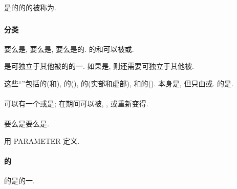 是\Function{}\Reference{}的\Execution{}的\Result{}的\Data{}\Entity{}被称为\Function{}\Result{}.

\subsubsection{\Data{}\Object{}}

\paragraph{\Data{}\Object{}分类}

\Data{}\Object{}要么是\Constant{}, 要么是\Variable{}, 要么是\Constant{}的\Subobject{}. \Named{}\Data{}\Object{}的\Type{}和\TypeParameter{}可以被\Explicitly{}或\Implicitly{}\Specify{}.

\Subobject{}是可独立于其他\Portion{}被\Reference{}的\Data{}\Object{}的一\Portion{}. 如果\Subobject{}是\Variable{}, 则还需要可独立于其他\Portion{}被\Define{}.

这些``\Portion{}''包括\Array{}的\Portion{}(\ArrayElement{}和\ArraySection{}), \CharacterString{}的\Portion{}(\Substring{}), \ComplexType{}\Object{}的\Portion{}(实部和虚部), 和\Structure{}的\Portion{}(\Component{}). \Subobject{}本身是\Data{}\Object{}, 但\Subobject{}只由\Object{}\Designator{}或\Intrinsic{}\Function{}\Reference{}. \Variable{}的\Subobject{}是\Variable{}.

\paragraph{\Variable{}}

\Variable{}可以有一个\Value{}或是\Undefined{}\Variable{}; 在\Program{}\Execution{}期间可以被\Define{}, \Redefine{}, 或重新变得\Undefined{}.

\paragraph{\Constant{}}

\Constant{}要么是\Named{}\Constant{}要么是\Literal{}\Constant{}.

\Named{}\Constant{}用 PARAMETER \Attribute{}定义.

\paragraph{\Constant{}的\Subobject{}}

\Constant{}的\Subobject{}是\Constant{}的一\Portion{}.

